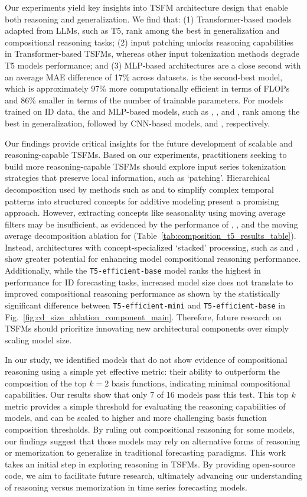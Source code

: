 Our experiments yield key insights into TSFM architecture design that enable both reasoning and generalization. We find that: (1) Transformer-based models adapted from LLMs, such as T5, rank among the best in generalization and compositional reasoning tasks; (2) input patching unlocks reasoning capabilities in Transformer-based TSFMs, whereas other input tokenization methods degrade T5 models performance; and (3) MLP-based architectures are a close second with an average MAE difference of 17\% across datasets. \NHITS is the second-best model, which is approximately 97\% more computationally efficient in terms of FLOPs and 86\% smaller in terms of the number of trainable parameters. For models trained on ID data, the \Tfive and MLP-based models, such as \NHITS, \NBEATS, and \MLP, rank among the best in generalization, followed by CNN-based models, \TimesNet and \TCN, respectively.

Our findings provide critical insights for the future development of scalable and reasoning-capable TSFMs. Based on our experiments, practitioners seeking to build more reasoning-capable TSFMs should explore input series tokenization strategies that preserve local information, such as `patching'. Hierarchical decomposition used by methods such as \NBEATS and \NHITS to simplify complex temporal patterns into structured concepts for additive modeling present a promising approach. However, extracting concepts like seasonality using moving average filters may be insufficient, as evidenced by the performance of \DLinear, \Autoformer, and the moving average decomposition ablation for \Tfive (Table~\ref{tab:composition_t5_results_table}). Instead, architectures with concept-specialized `stacked' processing, such as \NHITS and \NBEATS, show greater potential for enhancing model compositional reasoning performance. Additionally, while the \texttt{T5-efficient-base} model ranks the highest in performance for ID forecasting tasks, increased model size does not translate to improved compositional reasoning performance as shown by the statistically significant difference between \texttt{T5-efficient-mini} and \texttt{T5-efficient-base} in Fig.~\ref{fig:cd_size_ablation_component_main}. Therefore, future research on TSFMs should prioritize innovating new architectural components over simply scaling model size.

In our study, we identified models that do not show evidence of compositional reasoning using a simple yet effective metric: their ability to outperform the composition of the top $k=2$ basis functions, indicating minimal compositional capabilities. Our results show that only 7 of 16 models pass this test. This top $k$ metric provides a simple threshold for evaluating the reasoning capabilities of models, and can be scaled to higher and more challenging basis function composition thresholds. By ruling out compositional reasoning for some models, our findings suggest that those models may rely on alternative forms of reasoning or memorization to generalize in traditional forecasting paradigms. This work takes an initial step in exploring reasoning in TSFMs. By providing open-source code, we aim to facilitate future research, ultimately advancing our understanding of reasoning versus memorization in time series forecasting models.

